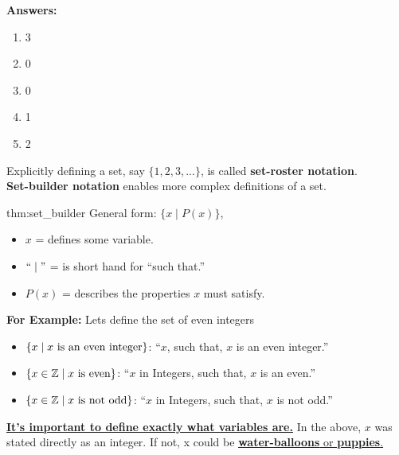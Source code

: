 \textbf{Answers:}
\begin{enumerate}
    \item 3
    \item 0
    \item 0
    \item 1
    \item 2
\end{enumerate}

\newpage

\noindent
Explicitly defining a set, say $\{1, 2, 3, ...\}$, is called \textbf{set-roster notation}.\\
\textbf{Set-builder notation} enables more complex definitions of a set.

\begin{theo}{thm:set_builder}
    General form: $\{x \mid P(x)\}$,
    \begin{itemize}
        \item $x$ = defines some variable.
        \item $``\mid"$ = is short hand for ``such that.''
        \item $P(x)$ = describes the properties $x$ must satisfy.
    \end{itemize}
\end{theo}

\noindent
\textbf{For Example:} Lets define the set of even integers\\
\vspace{-1em}
\begin{itemize}
    \item $\{x \mid x \textnormal{ is an even integer}\}$: ``$x$, such that, $x$ is an even integer.''
    \item $\{x \in \mathbb{Z} \mid x \textnormal{ is even}\}$: ``$x$ in Integers, such that, $x$ is an even.''
    \item $\{x \in \mathbb{Z} \mid x \textnormal{ is not odd}\}$: ``$x$ in Integers, such that, $x$ is not odd.''
\end{itemize}

\noindent
\underline{\textbf{It's important to define exactly what variables are.}}
In the above, $x$ was stated directly as an integer. If not, x could be \underline{\textbf{water-balloons} or \textbf{puppies}.}
